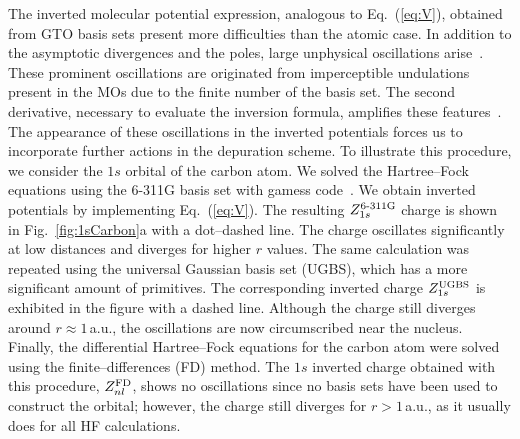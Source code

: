 \documentclass[10pt]{article}
\begin{document}
The inverted molecular potential expression, analogous 
to Eq.~(\ref{eq:V}), obtained from GTO basis sets present more difficulties
than the atomic case. In addition to the asymptotic divergences and
the poles, large unphysical 
oscillations arise~\cite{Schipper1997,Mura1997,Jacob2011,Gaiduk2013}. 
These prominent oscillations are originated from imperceptible undulations 
present in the MOs due to the finite number of the basis set. The
second derivative, necessary to evaluate the inversion formula, amplifies
these features~\cite{Schipper1997,Gaiduk2013}.
The appearance of these oscillations in the inverted potentials forces us to
incorporate further actions in the depuration scheme. To illustrate 
this procedure, we consider the $1s$ orbital of the carbon atom. 
We solved the Hartree--Fock equations using the \mbox{6-311G} basis set 
with {\sc gamess} code~\cite{Schmidt1993,Gordon2005}.
We obtain inverted potentials by implementing Eq.~(\ref{eq:V}). 
The resulting $Z_{1s}^{\mbox{\scriptsize 6-311G}}$ charge is shown in 
Fig.~\ref{fig:1sCarbon}a with a dot--dashed line. 
The charge oscillates significantly at low distances and diverges for 
higher $r$ values. The same calculation was 
repeated using the universal Gaussian basis set (UGBS), which has a 
more significant amount of primitives. The corresponding inverted 
charge $Z_{1s}^{\mbox{\scriptsize UGBS}}$ is exhibited in the figure 
with a dashed line. 
Although the charge still diverges around $r\approx1\,$a.u., the 
oscillations are now circumscribed near the nucleus.
Finally, the differential Hartree--Fock equations for the carbon 
atom were solved using the finite--differences (FD) method. 
The $1s$ inverted charge obtained with this procedure, 
$Z_{nl}^{\mbox{\scriptsize FD}}$, shows no oscillations since no basis 
sets have 
been used to construct the orbital; however, the charge still 
diverges for $r>1\,$a.u., as it usually does for all HF calculations.
\end{document}
